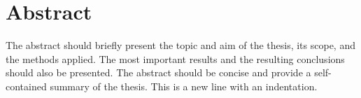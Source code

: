 \chapter*{Abstract}
The abstract should briefly present the topic and aim of the thesis, its scope,
and the methods applied. The most important results and the resulting conclusions
should also be presented. The abstract should be concise and provide a
self-contained summary of the thesis.
\newline \indent This is a new line with an indentation.

